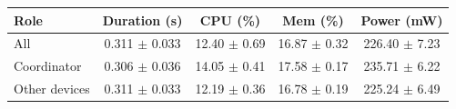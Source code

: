 \begin{tabular}{lcccc}
\hline
\textbf{Role} & \textbf{Duration (s)} & \textbf{CPU (\%)} & \textbf{Mem (\%)} & \textbf{Power (mW)} \\
\hline
All & 0.311 $\pm$ 0.033 & 12.40 $\pm$ 0.69 & 16.87 $\pm$ 0.32 & 226.40 $\pm$ 7.23 \\
Coordinator & 0.306 $\pm$ 0.036 & 14.05 $\pm$ 0.41 & 17.58 $\pm$ 0.17 & 235.71 $\pm$ 6.22 \\
Other devices & 0.311 $\pm$ 0.033 & 12.19 $\pm$ 0.36 & 16.78 $\pm$ 0.19 & 225.24 $\pm$ 6.49 \\
\hline
\end{tabular}
